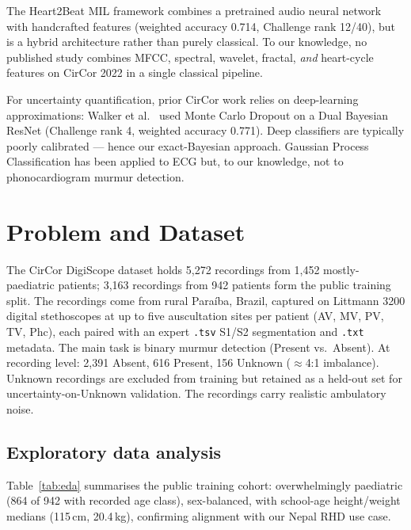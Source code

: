\documentclass[10pt,twocolumn]{article}
\begin{document}
The Heart2Beat MIL framework \citep{rohr2024heart2beat} combines a pretrained audio neural network with handcrafted features (weighted accuracy 0.714, Challenge rank 12/40), but is a hybrid architecture rather than purely classical. To our knowledge, no published study combines MFCC, spectral, wavelet, fractal, \textit{and} heart-cycle features on CirCor 2022 in a single classical pipeline.

For uncertainty quantification, prior CirCor work relies on deep-learning approximations: Walker et al.\ \citep{walker2022dbres} used Monte Carlo Dropout on a Dual Bayesian ResNet (Challenge rank 4, weighted accuracy 0.771). Deep classifiers are typically poorly calibrated \citep{guo2017} --- hence our exact-Bayesian approach. Gaussian Process Classification \citep{rasmussen2006} has been applied to ECG \citep{muygps2024} but, to our knowledge, not to phonocardiogram murmur detection.

\section{Problem and Dataset}

The CirCor DigiScope dataset \citep{circor_data, challenge2022} holds 5{,}272 recordings from 1{,}452 mostly-paediatric patients; 3{,}163 recordings from 942 patients form the public training split. The recordings come from rural Paraíba, Brazil, captured on Littmann 3200 digital stethoscopes at up to five auscultation sites per patient (AV, MV, PV, TV, Phc), each paired with an expert \texttt{.tsv} S1/S2 segmentation and \texttt{.txt} metadata. The main task is binary murmur detection (Present vs.\ Absent). At recording level: 2{,}391 Absent, 616 Present, 156 Unknown ($\approx$4:1 imbalance). Unknown recordings are excluded from training but retained as a held-out set for uncertainty-on-Unknown validation. The recordings carry realistic ambulatory noise.

\medskip

\subsection{Exploratory data analysis}

Table~\ref{tab:eda} summarises the public training cohort: overwhelmingly paediatric (864 of 942 with recorded age class), sex-balanced, with school-age height/weight medians (115\,cm, 20.4\,kg), confirming alignment with our Nepal RHD use case.
\end{document}
